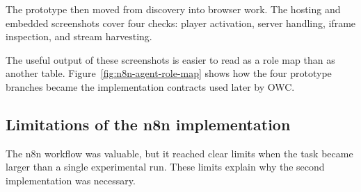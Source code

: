 

The prototype then moved from discovery into browser work. The hosting and embedded
screenshots cover four checks: player activation, server handling, iframe inspection,
and stream harvesting.



The useful output of these screenshots is easier to read as a role map than as another
table. Figure~\ref{fig:n8n-agent-role-map} shows how the four prototype branches became
the implementation contracts used later by OWC.



\subsection{Limitations of the n8n implementation}

The n8n workflow was valuable, but it reached clear limits when the task became
larger than a single experimental run. These limits explain why the second
implementation was necessary.

